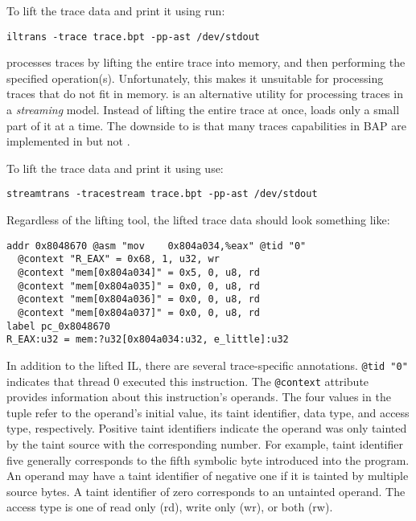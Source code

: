 To lift the trace data and print it using  run:

\begin{verbatim}
iltrans -trace trace.bpt -pp-ast /dev/stdout
\end{verbatim}

 processes traces by lifting the entire trace into
memory, and then performing the specified operation(s).
Unfortunately, this makes it unsuitable for processing traces that do
not fit in memory.   is an alternative utility
for processing traces in a \emph{streaming} model.  Instead of lifting
the entire trace at once,  loads only a small
part of it at a time.  The downside to  is that
many traces capabilities in BAP are implemented in 
but not .

To lift the trace data and print it using  use:

\begin{verbatim}
streamtrans -tracestream trace.bpt -pp-ast /dev/stdout
\end{verbatim}

Regardless of the lifting tool, the lifted trace data should look
something like:

\begin{verbatim}
addr 0x8048670 @asm "mov    0x804a034,%eax" @tid "0"
  @context "R_EAX" = 0x68, 1, u32, wr
  @context "mem[0x804a034]" = 0x5, 0, u8, rd
  @context "mem[0x804a035]" = 0x0, 0, u8, rd
  @context "mem[0x804a036]" = 0x0, 0, u8, rd
  @context "mem[0x804a037]" = 0x0, 0, u8, rd
label pc_0x8048670
R_EAX:u32 = mem:?u32[0x804a034:u32, e_little]:u32
\end{verbatim}

In addition to the lifted IL, there are several trace-specific
annotations.  \texttt{@tid "0"} indicates that thread 0 executed this
instruction.  The \texttt{@context} attribute provides information
about this instruction's operands.  The four values in the tuple refer
to the operand's initial value, its taint identifier, data type, and
access type, respectively.  Positive taint identifiers indicate the
operand was only tainted by the taint source with the corresponding
number.  For example, taint identifier five generally corresponds to
the fifth symbolic byte introduced into the program.  An operand may
have a taint identifier of negative one if it is tainted by multiple
source bytes.  A taint identifier of zero corresponds to an untainted
operand.  The access type is one of read only (rd), write only (wr),
or both (rw).

